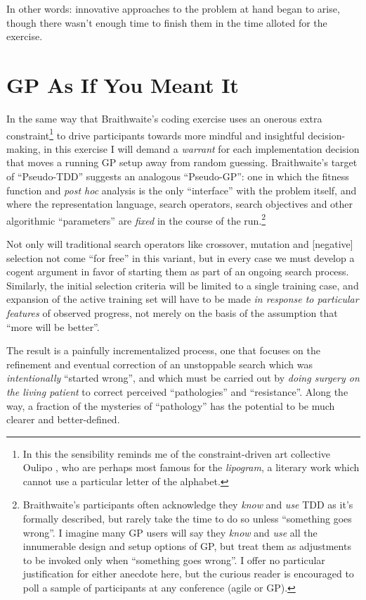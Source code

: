 In other words: innovative approaches to the problem at hand began to arise, though there wasn't enough time to finish them in the time alloted for the exercise.

\section{GP As If You Meant It}\hypertarget{gp-as-if-you-meant-it}{}\label{gp-as-if-you-meant-it}

In the same way that Braithwaite's coding exercise uses an onerous extra constraint\footnote{In this the sensibility reminds me of the constraint-driven art collective Oulipo \citep{Becker:2012}, who are perhaps most famous for the \emph{lipogram}, a literary work which cannot use a particular letter of the alphabet.} to drive participants towards more mindful and insightful decision-making, in this exercise I will demand a \emph{warrant} for each implementation decision that moves a running GP setup away from random guessing. Braithwaite's target of ``Pseudo-TDD'' suggests an analogous ``Pseudo-GP'': one in which the fitness function and \emph{post hoc} analysis is the only ``interface'' with the problem itself, and where the representation language, search operators, search objectives and other algorithmic ``parameters'' are \emph{fixed} in the course of the run.\footnote{Braithwaite's participants \citep{Braithwaite2012} often acknowledge they \emph{know} and \emph{use} TDD as it's formally described, but rarely take the time to do so unless ``something goes wrong''. I imagine many GP users will say they \emph{know} and \emph{use} all the innumerable design and setup options of GP, but treat them as adjustments to be invoked only when ``something goes wrong''. I offer no particular justification for either anecdote here, but the curious reader is encouraged to poll a sample of participants at any conference (agile or GP).}

Not only will traditional search operators like crossover, mutation and [negative] selection not come ``for free'' in this variant, but in every case we must develop a cogent argument in favor of starting them as part of an ongoing search process. Similarly, the initial selection criteria will be limited to a  single training case, and expansion of the active training set will have to be made \emph{in response to particular features} of observed progress, not merely on the basis of the assumption that ``more will be better''.

The result is a painfully incrementalized process, one that focuses on the refinement and eventual correction of an unstoppable search which was \emph{intentionally} ``started wrong'', and which must be carried out by \emph{doing surgery on the living patient} to correct perceived ``pathologies'' and ``resistance''. Along the way, a fraction of the mysteries of ``pathology'' has the potential to be much clearer and better-defined.

